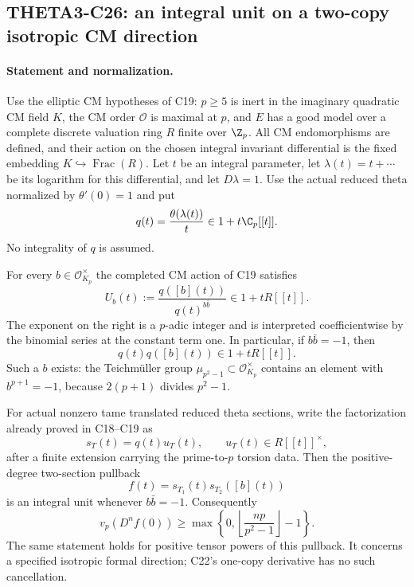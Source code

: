 \subsection{THETA3-C26: an integral unit on a two-copy isotropic CM direction}\label{C26}

\paragraph{Statement and normalization.}
Use the elliptic CM hypotheses of C19: $p\geq5$ is inert in the
imaginary quadratic CM field $K$, the CM order $\mathcal O$ is
maximal at $p$, and $E$ has a good model over a complete discrete
valuation ring $R$ finite over $\Z_p$.  All CM endomorphisms are
defined, and their action on the chosen integral invariant
differential is the fixed embedding $K\hookrightarrow\operatorname{Frac}(R)$.
Let $t$ be an integral parameter, let $\lambda(t)=t+\cdots$
be its logarithm for this differential, and let $D\lambda=1$.
Use the actual reduced theta normalized by $\theta'(0)=1$ and put
\[
 q(t)=\frac{\theta(\lambda(t))}{t}\in1+t\C_p[[t]].
\]
No integrality of $q$ is assumed.

For every $b\in\mathcal O_{K_p}^{\times}$ the completed CM
action of C19 satisfies
\begin{equation}\label{C26-unit-isogeny}
 U_b(t):=\frac{q([b](t))}{q(t)^{b\bar b}}
           \in1+tR[[t]].
\end{equation}
The exponent on the right is a $p$-adic integer and is interpreted
coefficientwise by the binomial series at the constant term one.
In particular, if $b\bar b=-1$, then
\begin{equation}\label{C26-two-copy-unit}
                  q(t)q([b](t))\in1+tR[[t]].
\end{equation}
Such a $b$ exists: the Teichm\"uller group
$\mu_{p^2-1}\subset\mathcal O_{K_p}^{\times}$ contains an element
with $b^{p+1}=-1$, because $2(p+1)$ divides $p^2-1$.

For actual nonzero tame translated reduced theta sections, write the
factorization already proved in C18--C19 as
\[
 s_T(t)=q(t)u_T(t),\qquad u_T(t)\in R[[t]]^{\times},
\]
after a finite extension carrying the prime-to-$p$ torsion data.
Then the positive-degree two-section pullback
\begin{equation}\label{C26-theta-pullback}
                 f(t)=s_{T_1}(t)s_{T_2}([b](t))
\end{equation}
is an integral unit whenever $b\bar b=-1$.
Consequently
\begin{equation}\label{C26-strong}
 v_p(D^nf(0))\geq
     \max\left\{0,\left\lfloor\frac{np}{p^2-1}\right\rfloor-1\right\}.
\end{equation}
The same statement holds for positive tensor powers of this
pullback.  It concerns a specified isotropic formal direction;
C22's one-copy derivative has no such cancellation.

